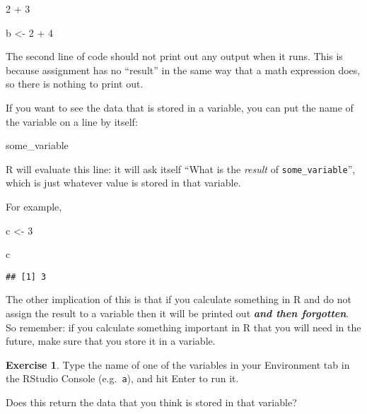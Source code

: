 \documentclass[
]{article}
\newenvironment{Shaded}{\begin{snugshade}}{\end{snugshade}}
\newcommand{\DecValTok}[1]{\textcolor[rgb]{0.00,0.00,0.81}{#1}}
\newcommand{\NormalTok}[1]{#1}
\newcommand{\OtherTok}[1]{\textcolor[rgb]{0.56,0.35,0.01}{#1}}
\newcommand{\SpecialCharTok}[1]{\textcolor[rgb]{0.00,0.00,0.00}{#1}}
\theoremstyle{definition}
\theoremstyle{definition}
\theoremstyle{definition}
\newtheorem{exercise}{Exercise}[section]
\theoremstyle{definition}
\theoremstyle{remark}
\begin{document}
\begin{Shaded}
\begin{Highlighting}[]
\DecValTok{2} \SpecialCharTok{+} \DecValTok{3}
\end{Highlighting}
\end{Shaded}

\begin{Shaded}
\begin{Highlighting}[]
\NormalTok{b }\OtherTok{\textless{}{-}} \DecValTok{2} \SpecialCharTok{+} \DecValTok{4}
\end{Highlighting}
\end{Shaded}

The second line of code should not print out any output when it runs.
This is because assignment has no ``result'' in the same way that a math expression does, so there is nothing to print out.

If you want to see the data that is stored in a variable, you can put the name of the variable on a line by itself:

\begin{Shaded}
\begin{Highlighting}[]
\NormalTok{some\_variable}
\end{Highlighting}
\end{Shaded}

R will evaluate this line: it will ask itself ``What is the \emph{result} of \texttt{some\_variable}'', which is just whatever value is stored in that variable.

For example,

\begin{Shaded}
\begin{Highlighting}[]
\NormalTok{c }\OtherTok{\textless{}{-}} \DecValTok{3}

\NormalTok{c}
\end{Highlighting}
\end{Shaded}

\begin{verbatim}
## [1] 3
\end{verbatim}

The other implication of this is that if you calculate something in R and do not assign the result to a variable then it will be printed out \textbf{\emph{and then forgotten}}.
So remember: if you calculate something important in R that you will need in the future, make sure that you store it in a variable.

\begin{exercise}
Type the name of one of the variables in your Environment tab in the RStudio Console (e.g.~\texttt{a}), and hit Enter to run it.

Does this return the data that you think is stored in that variable?
\end{exercise}
\end{document}
